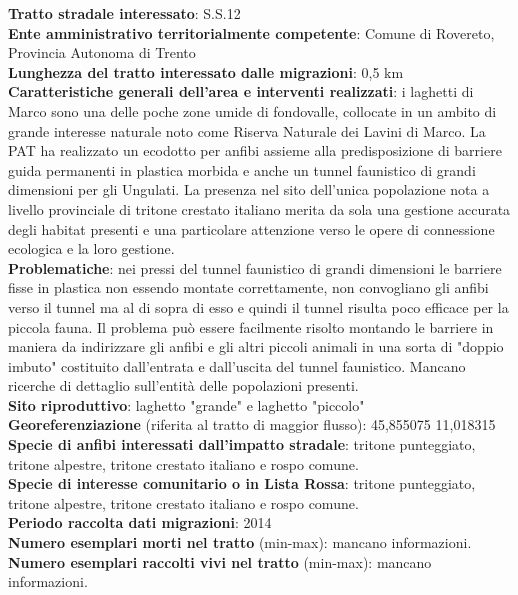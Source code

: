 \documentclass[11pt,a4paper,twoside]{memoir}
\begin{document}
\textbf{Tratto stradale interessato}: S.S.12 \\
\textbf{Ente amministrativo territorialmente competente}: Comune di Rovereto, Provincia Autonoma di Trento \\
\textbf{Lunghezza del tratto interessato dalle migrazioni}: 0,5 km \\
\textbf{Caratteristiche generali dell’area e interventi realizzati}: i laghetti di Marco sono una delle poche zone umide di fondovalle, collocate in un ambito di grande interesse naturale noto come Riserva Naturale dei Lavini di Marco. La PAT ha realizzato un ecodotto per anfibi assieme alla predisposizione di barriere guida permanenti in plastica morbida e anche un tunnel faunistico di grandi dimensioni per gli Ungulati. La presenza nel sito dell’unica popolazione nota a livello provinciale di tritone crestato italiano merita da sola una gestione accurata degli habitat presenti e una particolare attenzione verso le opere di connessione ecologica e la loro gestione. \\
\textbf{Problematiche}: nei pressi del tunnel faunistico di grandi dimensioni le barriere fisse in plastica non essendo montate correttamente, non convogliano gli anfibi verso il tunnel ma al di sopra di esso e quindi il tunnel risulta poco efficace per la piccola fauna. Il problema può essere facilmente risolto montando le barriere in maniera da indirizzare gli anfibi e gli altri piccoli animali in una sorta di "doppio imbuto" costituito dall'entrata e dall'uscita del tunnel faunistico. Mancano ricerche di dettaglio sull’entità delle popolazioni presenti. \\
\textbf{Sito riproduttivo}: laghetto "grande" e laghetto "piccolo" \\
\textbf{Georeferenziazione} (riferita al tratto di maggior flusso): 45,855075 11,018315 \\
\textbf{Specie di anfibi interessati dall’impatto stradale}: tritone punteggiato, tritone alpestre, tritone crestato italiano e rospo comune. \\
\textbf{Specie di interesse comunitario o in Lista Rossa}: tritone punteggiato, tritone alpestre, tritone crestato italiano e rospo comune. \\
\textbf{Periodo raccolta dati migrazioni}: 2014 \\
\textbf{Numero esemplari morti nel tratto} (min-max): mancano informazioni. \\
\textbf{Numero esemplari raccolti vivi nel tratto} (min-max): mancano informazioni. \\
\end{document}
